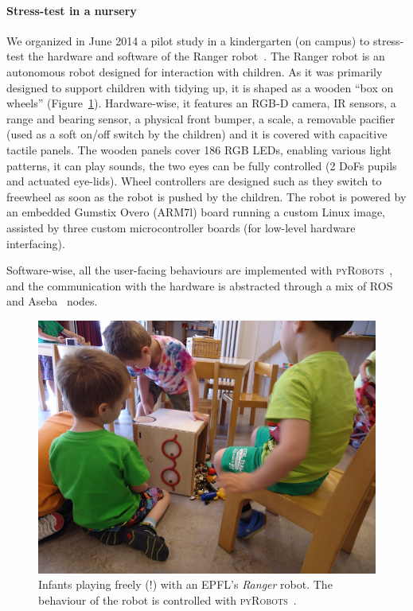 \documentclass[a4paper, 10pt, conference]{ieeeconf}      %
\newcommand{\pyRobots}{\textsc{pyRobots}\ }
\begin{document}
\paragraph{Stress-test in a nursery}

We organized in June 2014 a pilot study in a kindergarten (on campus) to
stress-test the hardware and software of the Ranger
robot~\cite{mondada2014ranger}. The Ranger robot is an autonomous robot designed
for interaction with children. As it was primarily designed to support children
with tidying up, it is shaped as a wooden ``box on wheels''
(Figure~\ref{expe-nursery}). Hardware-wise, it features an RGB-D camera, IR
sensors, a range and bearing sensor, a physical front bumper, a scale, a
removable pacifier (used as a soft on/off switch by the children) and it is
covered with capacitive tactile panels. The wooden panels cover 186 RGB LEDs,
enabling various light patterns, it can play sounds, the two eyes can be fully
controlled (2 DoFs pupils and actuated eye-lids). Wheel controllers are designed
such as they switch to freewheel as soon as the robot is pushed by the children.
The robot is powered by an embedded Gumstix Overo (ARM7l) board running a custom
Linux image, assisted by three custom microcontroller boards (for low-level
hardware interfacing).

Software-wise, all the user-facing behaviours are implemented with \pyRobots,
and the communication with the hardware is abstracted through a mix of ROS
and Aseba~\cite{magnenat2011aseba} nodes.

\begin{figure}
        \centering
        \includegraphics[width=0.9\columnwidth]{ranger-side}
        \caption{Infants playing freely (!) with an EPFL's \emph{Ranger} robot.
        The behaviour of the robot is controlled with \pyRobots.}
        \label{expe-nursery}
\end{figure}
\end{document}
